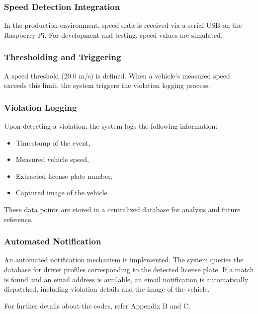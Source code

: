 \subsubsection{Speed Detection Integration}

In the production environment, speed data is received via a serial USB on the Raspberry Pi. For development and testing, speed values are simulated.

\subsubsection{Thresholding and Triggering}

A speed threshold (20.0 m/s) is defined. When a vehicle's measured speed exceeds this limit, the system triggers the violation logging process.

\subsubsection{Violation Logging}

Upon detecting a violation, the system logs the following information:
\begin{itemize}
    \item Timestamp of the event,
    \item Measured vehicle speed,
    \item Extracted license plate number,
    \item Captured image of the vehicle.
\end{itemize}
These data points are stored in a centralized database for analysis and future reference.

\subsubsection{Automated Notification}

An automated notification mechanism is implemented. The system queries the database for driver profiles corresponding to the detected license plate. If a match is found and an email address is available, an email notification is automatically dispatched, including violation details and the image of the vehicle.

For further details about the codes, refer Appendix B and C.